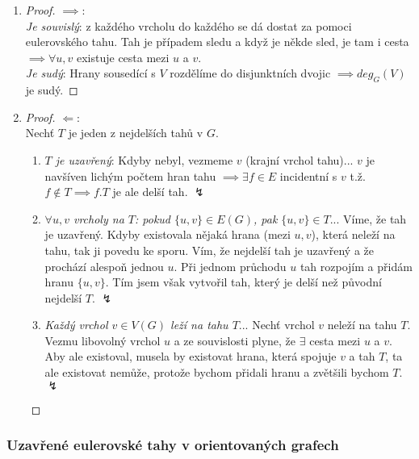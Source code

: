 \documentclass[10pt,a4paper]{article}
\begin{document}
\begin{enumerate}
    \item \begin{proof} $\implies$:\\
        \textit{Je souvislý}: z každého vrcholu do každého se dá dostat za pomoci eulerovského tahu. Tah je případem sledu a když je někde sled, je tam i cesta $\implies \forall u,v$ existuje cesta mezi $u$ a $v$.\\ 
        \textit{Je sudý}: Hrany sousedící s $V$ rozdělíme do disjunktních dvojic $\implies deg_G (V)$ je sudý. 
        \end{proof}
    \item \begin{proof} $\Longleftarrow$:\\
            Nechť $T$ je jeden z nejdelších tahů v $G$.
            \begin{enumerate}
                \item \textit{$T$ je uzavřený}: Kdyby nebyl, vezmeme $v$ (krajní vrchol tahu)... $v$ je navšíven lichým počtem hran tahu $\implies \exists f\in E$ incidentní s $v$ t.ž. $f\notin T \implies f.T$ je ale delší tah. $\lightning$
                \item \textit{$\forall u,v$ vrcholy na $T$: pokud $\{u,v\} \in E(G)$, pak $\{u, v\} \in T$}... Víme, že tah je uzavřený. Kdyby existovala nějaká hrana (mezi $u,v$), která neleží na tahu, tak ji povedu ke sporu. Vím, že nejdelší tah je uzavřený a že prochází alespoň jednou $u$. Při jednom průchodu $u$ tah rozpojím a přidám hranu $\{u,v\}$. Tím jsem však vytvořil tah, který je delší než původní nejdelší $T$. $\lightning$
                \item \textit{Každý vrchol $v\in V(G)$ leží na tahu $T$}... Nechť vrchol $v$ neleží na tahu $T$. Vezmu libovolný vrchol $u$ a ze souvislosti plyne, že $\exists$ cesta mezi $u$ a $v$. Aby ale existoval, musela by existovat hrana, která spojuje $v$ a tah $T$, ta ale existovat nemůže, protože bychom přidali hranu a zvětšili bychom $T$. $\lightning$
            \end{enumerate}
        \end{proof}
\end{enumerate}

\subsubsection{Uzavřené eulerovské tahy v orientovaných grafech}
\end{document}
